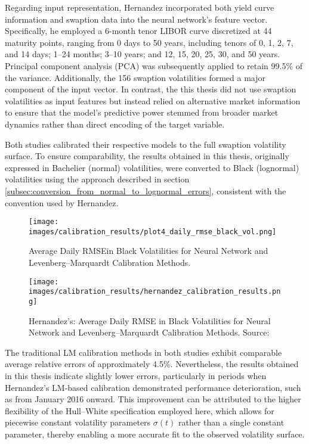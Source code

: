 Regarding input representation, Hernandez incorporated both yield curve information and swaption data into the neural network’s feature vector. Specifically, he employed a 6-month tenor LIBOR curve discretized at 44 maturity points, ranging from 0 days to 50 years, including tenors of 0, 1, 2, 7, and 14 days; 1--24 months; 3--10 years; and 12, 15, 20, 25, 30, and 50 years. Principal component analysis (PCA) was subsequently applied to retain 99.5\% of the variance. Additionally, the 156 swaption volatilities formed a major component of the input vector. In contrast, the this thesis did not use swaption volatilities as input features but instead relied on alternative market information to ensure that the model’s predictive power stemmed from broader market dynamics rather than direct encoding of the target variable.

Both studies calibrated their respective models to the full swaption volatility surface. To ensure comparability, the results obtained in this thesis, originally expressed in Bachelier (normal) volatilities, were converted to Black (lognormal) volatilities using the approach described in section \ref{subsec:conversion_from_normal_to_lognormal_errors}, consistent with the convention used by Hernandez.

\begin{figure}[H]
	\centering
	\texttt{[image: images/calibration\_results/plot4\_daily\_rmse\_black\_vol.png]}
	\caption{Average Daily RMSEin Black Volatilities for Neural Network and Levenberg--Marquardt Calibration Methods.}
	\label{fig:daily_rmse_black_vol}
\end{figure}

\begin{figure}[H]
	\centering
	\texttt{[image: images/calibration\_results/hernandez\_calibration\_results.png]}
	\caption{Hernandez's: Average Daily RMSE in Black Volatilities for Neural Network and Levenberg--Marquardt Calibration Methods. Source: \parencite[figure~3]{hernandez2016model}}
	\label{fig:daily_rmse_black_vol}
\end{figure}


The traditional LM calibration methods in both studies exhibit comparable average relative errors of approximately 4.5\%. Nevertheless, the results obtained in this thesis indicate slightly lower errors, particularly in periods when Hernandez’s LM-based calibration demonstrated performance deterioration, such as from January 2016 onward. This improvement can be attributed to the higher flexibility of the Hull–White specification employed here, which allows for piecewise constant volatility parameters $\sigma(t)$ rather than a single constant parameter, thereby enabling a more accurate fit to the observed volatility surface.

